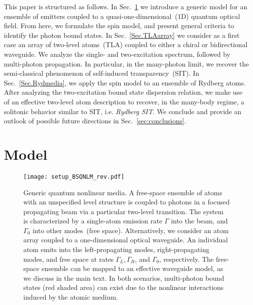 \documentclass[pra,twocolumn,showpacs,preprintnumbers,amsmath,amssymb]{revtex4-1}
\begin{document}
This paper is structured as follows. In Sec.~\ref{Sec. model}  we introduce a generic model for an ensemble of emitters coupled to a quasi-one-dimensional~(1D) quantum optical field. From here, we formulate the spin model, and present general criteria to identify the photon bound states. In Sec.~\ref{Sec.TLAarray} we consider as a first case an array of  two-level atoms~(TLA) coupled to either a  chiral or bidirectional  waveguide. We analyze the single- and two-excitation spectrum, followed by multi-photon propagation. In particular, in the many-photon limit, we recover the semi-classical phenomenon of self-induced transparency~(SIT). In Sec.~\ref{Sec.Rydmedia}, we apply the spin model to an ensemble of Rydberg atoms. After analyzing the two-excitation bound state dispersion relation, we make use of an effective two-level atom description to recover, in the many-body regime, a solitonic behavior similar to SIT, i.e. \emph{Rydberg SIT}. We conclude and provide an outlook of possible future directions in Sec.~\ref{sec:conclusions}.

\section{Model}\label{Sec. model}

\begin{figure}
\centering
\texttt{[image: setup\_BSQNLM\_rev.pdf]}%
\caption{Generic quantum nonlinear media. A free-space ensemble of atoms with an unspecified level structure is coupled to photons in a focused propagating beam via a particular two-level transition. The system is characterized by a single-atom emission rate $\Gamma$ into the beam, and $\Gamma_0$ into other modes~(free space). Alternatively, we consider an atom array coupled to a one-dimensional optical waveguide. An individual atom emits into the left-propagating modes, right-propagating modes, and free space at rates $\Gamma_L, \Gamma_R$, and $\Gamma_0$, respectively. The free-space ensemble can be mapped to an effective waveguide model, as we discuss in the main text. In both scenarios, multi-photon bound states (red shaded area) can exist due to the nonlinear interactions induced by the atomic medium.}
\label{fig:setup}
\end{figure}
\end{document}
